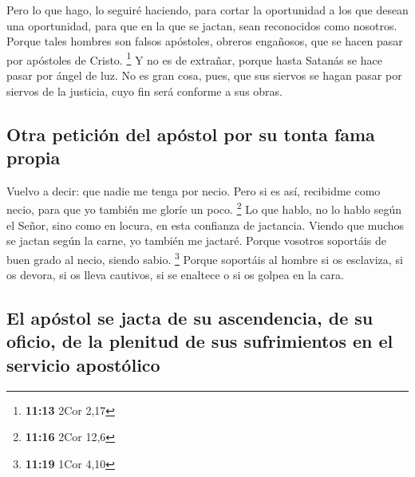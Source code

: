  Pero lo que hago, lo seguiré haciendo, para cortar la
oportunidad a los que desean una oportunidad, para que en la que se
jactan, sean reconocidos como nosotros.  Porque tales
hombres son falsos apóstoles, obreros engañosos, que se hacen pasar por
apóstoles de Cristo. \footnote{\textbf{11:13} 2Cor 2,17} 
Y no es de extrañar, porque hasta Satanás se hace pasar por ángel de
luz.  No es gran cosa, pues, que sus siervos se hagan
pasar por siervos de la justicia, cuyo fin será conforme a sus obras.

\hypertarget{otra-peticiuxf3n-del-apuxf3stol-por-su-tonta-fama-propia}{%
\subsection{Otra petición del apóstol por su tonta fama
propia}\label{otra-peticiuxf3n-del-apuxf3stol-por-su-tonta-fama-propia}}

 Vuelvo a decir: que nadie me tenga por necio. Pero si es
así, recibidme como necio, para que yo también me gloríe un poco.
\footnote{\textbf{11:16} 2Cor 12,6}  Lo que hablo, no lo
hablo según el Señor, sino como en locura, en esta confianza de
jactancia.  Viendo que muchos se jactan según la carne,
yo también me jactaré.  Porque vosotros soportáis de buen
grado al necio, siendo sabio. \footnote{\textbf{11:19} 1Cor 4,10}
 Porque soportáis al hombre si os esclaviza, si os
devora, si os lleva cautivos, si se enaltece o si os golpea en la cara.

\hypertarget{el-apuxf3stol-se-jacta-de-su-ascendencia-de-su-oficio-de-la-plenitud-de-sus-sufrimientos-en-el-servicio-apostuxf3lico}{%
\subsection{El apóstol se jacta de su ascendencia, de su oficio, de la
plenitud de sus sufrimientos en el servicio
apostólico}\label{el-apuxf3stol-se-jacta-de-su-ascendencia-de-su-oficio-de-la-plenitud-de-sus-sufrimientos-en-el-servicio-apostuxf3lico}}

